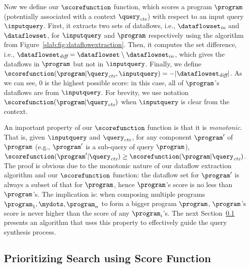 {
Now we define our $\scorefunction$ function, which scores a program $\program$ (potentially associated with a context $\query_{\emph{ctx}}$) with respect to an input query $\inputquery$. 
First, it extracts two sets of dataflows, i.e., $\dataflowset_{\emph{in}}$ and $\dataflowset$, for $\inputquery$ and $\program$ respectively using the algorithm from Figure~\ref{slab:fig:dataflowextraction}. 
Then, it computes the set difference, i.e., $\dataflowset_{\emph{diff}} = \dataflowset \setminus \dataflowset_{in}$, which gives the dataflows in $\program$ but not in $\inputquery$. 
Finally, we define $\scorefunction(\program | \query_{\emph{ctx}}, \inputquery) = -|\dataflowset_{\emph{diff}}|$. 
As we can see, $0$ is the highest possible score: in this case, all of $\program$'s dataflows are from $\inputquery$. 
For brevity, we use notation $\scorefunction(\program|\query_{\emph{ctx}})$ when $\inputquery$ is clear from the context.}




{
An important property of our $\scorefunction$ function is that it is \emph{monotonic}. 
That is, given $\inputquery$ and $\query_{\emph{ctx}}$, for any component $\program'$ of $\program$ (e.g., $\program'$ is a sub-query of query $\program$), $\scorefunction(\program'|\query_{\emph{ctx}}) \geq \scorefunction(\program|\query_{\emph{ctx}})$. 
The proof is obvious due to the monotonic nature of our dataflow extraction algorithm and our $\scorefunction$ function: the dataflow set for $\program'$ is always a subset of that for $\program$, hence $\program$'s score is no less than $\program$'s. 
The implication is: when composing multiple programs $\program_1, \mydots, \program_n$ to form a bigger program $\program$, $\program$'s score is never higher than the score of any $\program_i$'s. 
The next Section~\ref{slab:sec:prioritizingsearch} presents an algorithm that uses this property to effectively guide the query synthesis process.}









\subsection{Prioritizing Search using Score Function}
\label{slab:sec:prioritizingsearch}



